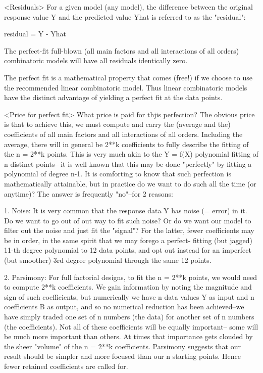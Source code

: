<Residuals>
For a given model (any model), the difference
between the original response value Y and the
predicted value Yhat is referred to as the
"residual":

   residual = Y - Yhat

The perfect-fit full-blown (all main factors and
all interactions of all orders) combinatoric
models will have all residuals identically zero.

The perfect fit is a mathematical property that comes
(free!) if we choose to use the recommended linear
combinatoric model.  Thus linear combinatoric
models have the distinct advantage of yielding a
perfect fit at the data points.

<Price for perfect fit>
What price is paid for thjis perfection?  The
obvious price is that to achieve this, we must
compute and carry the (average and the)
coefficients of all main factors and all
interactions of all orders.  Including the
average, there will in general be 2**k
coefficients to fully describe the fitting of the
n = 2**k points.  This is very much akin to the Y
= f(X) polynomial fitting of n distinct points--
it is well known that this may be done "perfectly"
by fitting a polynomial of degree n-1.  It is
comforting to know that such perfection is
mathematically attainable, but in practice do we
want to do such all the time (or anytime)?  The
answer is frequently "no"--for 2 reasons:

   1. Noise: It is very common that the response
             data Y has noise (= error) in it.  Do
             we want to go out of out way to fit
             such noise?  Or do we want our model
             to filter out the noise and just fit
             the "signal"?  For the latter, fewer
             coefficients may be in order, in the
             same spirit that we may forego a
             perfect- fitting (but jagged) 11-th
             degree polynomial to 12 data points,
             and opt out instead for an imperfect
             (but smoother) 3rd degree polynomial
             through the same 12 points.

   2. Parsimony: For full factorial designs, to fit
             the n = 2**k points, we would need to
             compute 2**k coefficients.  We gain
             information by noting the magnitude
             and sign of such coefficients, but
             numerically we have n data values Y
             as input and n coefficients B as
             output, and so no numerical reduction
             has been achieved--we have simply
             traded one set of n numbers (the
             data) for another set of n numbers
             (the coefficients).  Not all of these
             coefficients will be equally
             important-- some will be much more
             important than others.  At times that
             importance gets clouded by the sheer
             "volume" of the n = 2**k
             coefficients.  Parsimony suggests
             that our result should be simpler and
             more focused than our n starting
             points.  Hence fewer retained
             coefficients are called for.

